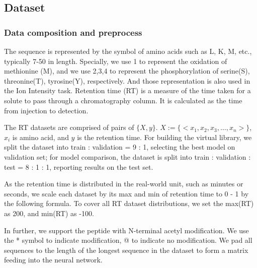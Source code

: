 
\subsection{Dataset}
\subsubsection*{Data composition and preprocess}
The sequence is represented by the symbol of amino acids such as L, K, M, etc., typically 7-50
in length. Specially, we use 1 to represent the oxidation of methionine (M), and we use 2,3,4 to represent the phosphorylation of serine(S), threonine(T), tyrosine(Y), respectively. And those representation is also used in the Ion Intensity task.
Retention time (RT) is a measure of the time taken for a solute to pass through a chromatography column.
It is calculated as the time from injection to detection.

The RT datasets are comprised of pairs of
\( \{X, y\} \). $X:= \{ <x_1, x_2, x_3,\dots, x_n> \}$, $x_i$
is amino acid,
and \( y \) is the retention time. For building the virtual library, we split the dataset into train : validation = 9 : 1,
selecting the best model on validation set; for model comparison, the dataset is split into train : validation : test
= 8 : 1 : 1, reporting results on the test set.

As the retention time is distributed in the real-world unit, such as minutes or seconds, we scale each dataset by its max and min of retention time to 0 - 1 by the following formula. To cover all RT dataset distributions, we set the max(RT) as 200, and min(RT) as -100.

In further, we support the peptide with N-terminal acetyl modification. We use the * symbol to indicate modification, @ to indicate no modification. We pad all sequences to the length of the longest sequence in the dataset to form a matrix feeding into the neural network.

